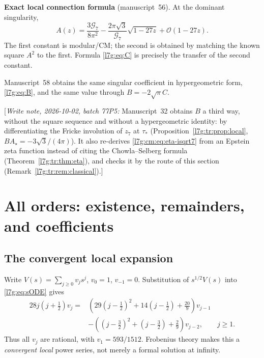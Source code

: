 \documentclass[11pt,letterpaper]{article}
\theoremstyle{remark}\newtheorem{remark}[theorem]{Remark}
\newcommand{\G}{\mathcal G_7}\newcommand{\Ast}{A_\star}
\newcommand{\bigO}{\mathcal O}\newcommand{\Ct}{C_{t}}
\newcommand{\writenote}[1]{\textup{[}\emph{Write note, 2026-10-02, batch 77P5:} #1\textup{]}}
\newcounter{l7gtrsavedeq}
\begin{document}
\begin{resultbox}
\textbf{Exact local connection formula} (manuscript~56).
At the dominant singularity,
\begin{equation}\label{l7g:cm:eq:local-highlight}
 A(z)=\frac{3\G}{8\pi^2}
 -\frac{2\pi\sqrt3}{\G}\sqrt{1-27z}
 +\bigO(1-27z).
\end{equation}
The first constant is modular/CM; the second is obtained by matching the
known square $A^2$ to the first. Formula \eqref{l7g:eq:C} is precisely
the transfer of the second constant.
\end{resultbox}
Manuscript~58 obtains the same singular coefficient in hypergeometric form,
\eqref{l7g:eq:B}, and the same value through $B=-2\sqrt\pi C$.

\writenote{Manuscript~32 obtains $B$ a third way, without the square
sequence and without a hypergeometric identity: by differentiating the
Fricke involution of $z_7$ at $\tau_*$
(Proposition~\ref{l7g:tr:prop:local}, $B\Ast=-3\sqrt3/(4\pi)$). It also
re-derives \eqref{l7g:cm:eq:eta-isqrt7} from an Epstein zeta function
instead of citing the Chowla--Selberg formula
(Theorem~\ref{l7g:tr:thm:eta}), and checks it by the route of this
section (Remark~\ref{l7g:tr:rem:classical}).}

\section{All orders: existence, remainders, and coefficients}\label{l7g:sec:allorders}
\subsection{The convergent local expansion}
Write $V(s)=\sum_{j\ge0}v_js^j$, $v_0=1$, $v_{-1}=0$.
Substitution of $s^{1/2}V(s)$ into \eqref{l7g:eq:sODE} gives
\begin{equation}\label{l7g:eq:vrec}
\begin{split}
28j(j+\tfrac12)v_j={}&
 \left(29(j-\tfrac12)^2+14(j-\tfrac12)+\frac{20}{9}\right)v_{j-1}\\
 &-\left((j-\tfrac32)^2+(j-\tfrac32)+\frac29\right)v_{j-2},\qquad j\ge1.
\end{split}
\end{equation}
Thus all $v_j$ are rational, with $v_1=593/1512$. Frobenius theory makes
this a \emph{convergent local} power series, not merely a formal solution
at infinity.
\end{document}
